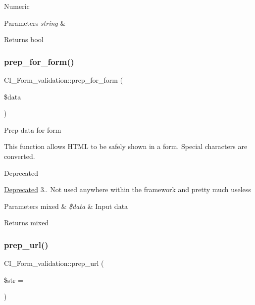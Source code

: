 Numeric


\begin{DoxyParams}{Parameters}
{\em string} & \\
\hline
\end{DoxyParams}
\begin{DoxyReturn}{Returns}
bool 
\end{DoxyReturn}
\mbox{\label{class_c_i___form__validation_a4dd9fb50878d6fd7f9b00202a5eff2f4}} 
\subsubsection{\texorpdfstring{prep\+\_\+for\+\_\+form()}{prep\_for\_form()}}
{\footnotesize\ttfamily C\+I\+\_\+\+Form\+\_\+validation\+::prep\+\_\+for\+\_\+form (\begin{DoxyParamCaption}\item[{}]{\$data }\end{DoxyParamCaption})}

Prep data for form

This function allows H\+T\+ML to be safely shown in a form. Special characters are converted.

\begin{DoxyRefDesc}{Deprecated}
\item[\mbox{\hyperlink{deprecated__deprecated000019}{Deprecated}}]3.. Not used anywhere within the framework and pretty much useless \end{DoxyRefDesc}

\begin{DoxyParams}[1]{Parameters}
mixed & {\em \$data} & Input data \\
\hline
\end{DoxyParams}
\begin{DoxyReturn}{Returns}
mixed 
\end{DoxyReturn}
\mbox{\label{class_c_i___form__validation_aa66e364fa7d87870a9fda5dbdfbbb2a5}} 
\subsubsection{\texorpdfstring{prep\+\_\+url()}{prep\_url()}}
{\footnotesize\ttfamily C\+I\+\_\+\+Form\+\_\+validation\+::prep\+\_\+url (\begin{DoxyParamCaption}\item[{}]{\$str = {\ttfamily \textquotesingle{}\textquotesingle{}} }\end{DoxyParamCaption})}

